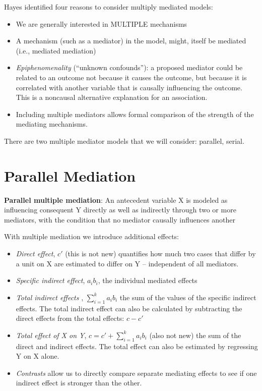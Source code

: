 \documentclass[
  11pt,
]{book}
\providecommand{\tightlist}{%
  \setlength{\itemsep}{0pt}\setlength{\parskip}{0pt}}
\begin{document}
Hayes \citeyearpar{hayes_introduction_2018} identified four reasons to consider multiply mediated models:

\begin{itemize}
\tightlist
\item
  We are generally interested in MULTIPLE mechanisms
\item
  A mechanism (such as a mediator) in the model, might, itself be mediated (i.e., mediated mediation)
\item
  \emph{Epiphenomenality} (``unknown confounds''): a proposed mediator could be related to an outcome not because it causes the outcome, but because it is correlated with another variable that is causally influencing the outcome. This is a noncausal alternative explanation for an association.
\item
  Including multiple mediators allows formal comparison of the strength of the mediating mechanisms.
\end{itemize}

There are two multiple mediator models that we will consider: parallel, serial.

\hypertarget{parallel-mediation}{%
\section{Parallel Mediation}\label{parallel-mediation}}

\textbf{Parallel multiple mediation}: An antecedent variable X is modeled as influencing consequent Y directly as well as indirectly through two or more mediators, with the condition that no mediator causally influences another \citep[p.~149]{hayes_introduction_2018}

With multiple mediation we introduce additional effects:

\begin{itemize}
\tightlist
\item
  \emph{Direct effect}, \(c'\) (this is not new) quantifies how much two cases that differ by a unit on X are estimated to differ on Y -- independent of all mediators.
\item
  \emph{Specific indirect effect}, \(a_{i}b_{i}\), the individual mediated effects
\item
  \emph{Total indirect effects }, \(\sum_{i=1}^{k}a_{i}b_{i}\) the sum of the values of the specific indirect effects. The total indirect effect can also be calculated by subtracting the direct effects from the total effects: \(c - c'\)
\item
  \emph{Total effect of X on Y}, \(c = c' + \sum_{i=1}^{k}a_{i}b_{i}\) (also not new) the sum of the direct and indirect effects. The total effect can also be estimated by regressing Y on X alone.
\item
  \emph{Contrasts} allow us to directly compare separate mediating effects to see if one indirect effect is stronger than the other.
\end{itemize}
\end{document}
